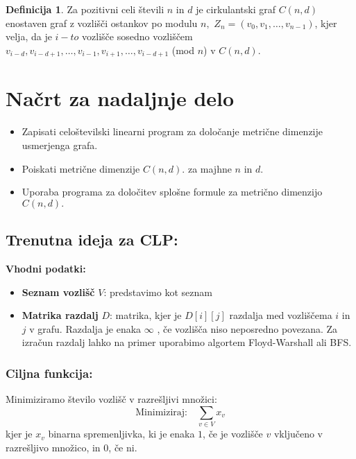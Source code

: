 \documentclass[a4paper,12pt]{article}
\theoremstyle{definition}
\newtheorem{definicija}{Definicija}[section]
\theoremstyle{remark}
\theoremstyle{definition}
\begin{document}
\begin{definicija}
    Za pozitivni celi števili $n$ in $d$ je cirkulantski graf $C(n, d)$ enostaven graf z vozlišči 
    ostankov po modulu $n,$ $Z_n = (v_0, v_1, \dots ,v_{n-1})$, kjer velja, da je $i-to$ vozlišče 
    sosedno vozliščem $v_{i-d}, v_{i-d+1}, \dots ,v_{i-1}, v_{i+1}, \dots ,v_{i-d+1}$ (mod $n$)
    v $C(n,d).$ \cite{Chau2017}
\end{definicija}

\section{Načrt za nadaljnje delo}

\begin{itemize}
    \item Zapisati celoštevilski linearni program za določanje metrične dimenzije usmerjenga grafa. 
    \item Poiskati metrične dimenzije $C(n, d).$ za majhne $n$ in $d$.
    \item Uporaba programa za določitev splošne formule za metrično dimenzijo $C(n, d).$
\end{itemize}



\subsection*{Trenutna ideja za CLP:}

\noindent
\textbf{Vhodni podatki:}
\begin{itemize}
    \item \textbf{Seznam vozlišč} \( V \): predstavimo kot seznam 
    \item \textbf{Matrika razdalj} \( D \): matrika, kjer je \( D[i][j] \) razdalja med vozliščema \( i \) in \( j \) v grafu. Razdalja je enaka  $\infty$ , če vozlišča niso neposredno povezana.
    Za izračun razdalj lahko na primer uporabimo algortem Floyd-Warshall ali BFS.
\end{itemize}

\subsubsection*{Ciljna funkcija:}
Minimiziramo število vozlišč v razrešljivi množici:
\begin{equation*}
\text{Minimiziraj:} \quad \sum_{v \in V} x_v
\end{equation*}
kjer je $x_v$ binarna spremenljivka, ki je enaka $1$, če je vozlišče $v$ vključeno v razrešljivo množico, in $0$, če ni.
\end{document}
